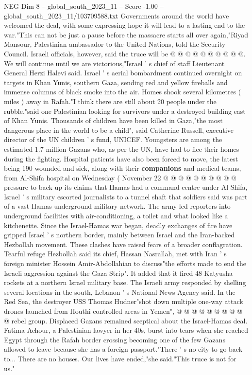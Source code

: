 \begin{textsample}{NEG Dim 8 – global\_south\_2023\_11 – Score -1.00 – global\_south\_2023\_11/103709588.txt}
Governments around the world have welcomed the deal, with some expressing hope it will lead to a lasting end to the war."This can not be just a pause before the massacre starts all over again,"Riyad Mansour, Palestinian ambassador to the United Nations, told the Security Council.
Israeli officials, however, said the truce will be @ @ @ @ @ @ @ @ @ @.
We will continue until we are victorious,"Israel ' s chief of staff Lieutenant General Herzi Halevi said.
Israel ' s aerial bombardment continued overnight on targets in Khan Yunis, southern Gaza, sending red and yellow fireballs and immense columns of black smoke into the air.
Homes shook several kilometres ( miles ) away in Rafah."I think there are still about 20 people under the rubble,"said one Palestinian looking for survivors under a destroyed building east of Khan Yunis.
Thousands of children have been killed in Gaza,"the most dangerous place in the world to be a child", said Catherine Russell, executive director of the UN children ' s fund, UNICEF.
Youngsters are among the estimated 1.7 million Gazans who, as per the UN, have had to flee their homes during the fighting.
Hospital patients have also been forced to move, the latest being 190 wounded and sick, along with their \textbf{companions} and medical teams, from Al-Shifa hospital on Wednesday ( November 22 @ @ @ @ @ @ @ @ @ @ pressure to back up its claims that Hamas had a command centre under Al-Shifa, Israel ' s military escorted journalists to a tunnel shaft that soldiers said was part of a vast Hamas underground military network.
The army led reporters into underground facilities with air-conditioning, a toilet and what looked like a kitchenette.
Since the Israel-Hamas war began, deadly exchanges of fire have gripped Israel ' s northern border, mainly between Israel and the Iran-backed Hezbollah movement.
These clashes have raised fears of a broader conflagration.
Tearful refuge Hezbollah said its chief, Hassan Nasrallah, met with Iran ' s foreign minister Hossein Amir-Abdollahian to discuss"the efforts made to end the Israeli aggression against the Gaza Strip".
It added that it fired 48 Katyusha rockets at a northern Israel military base.
The Israeli army responded by shelling several locations in the south, Lebanon ' s National News Agency said.
In the Red Sea, the destroyer USS Thomas Hudner"shot down multiple one-way attack drones launched from Houthi-controlled areas in Yemen", @ @ @ @ @ @ @ @ @ @ rebel group.
Displaced Gazans remained sceptical about the Israel-Hamas deal.
Fatima Achour, a Palestinian lawyer in her 40s, burst into tears when she reached Egypt through the Rafah border crossing becoming one of the few Gazans allowed to leave because she has a foreign passport."There ' s no city to go back to...
There are no houses.
Our lives have ended,"she said."This truce is not for us."

\end{textsample}
